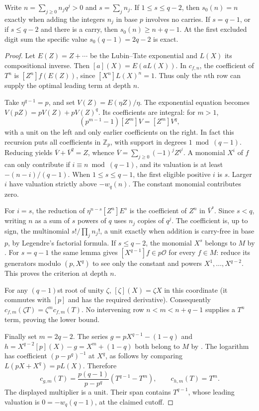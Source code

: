 \begin{theorem}\label{thm:first-depth}
Write $n=\sum_{j\ge0}n_jq^j>0$ and $s=\sum_j n_j$. If $1\le s\le q-2$, then $s_0(n)=n$ exactly when adding the integers $n_j$ in base $p$ involves no carries. If $s=q-1$, or if $s\le q-2$ and there is a carry, then $s_0(n)\ge n+q-1$. At the first excluded digit sum the specific value $s_0(q-1)=2q-2$ is exact.
\end{theorem}
\begin{proof}
Let $E(Z)=Z+\cdots$ be the Lubin--Tate exponential and $L(X)$ its compositional inverse. Then $[a](X)=E(aL(X))$. In $c_{f,n}$, the coefficient of $T^n$ is $[Z^n]f(E(Z))$, since $[X^n]L(X)^n=1$. Thus only the $n$th row can supply the optimal leading term at depth $n$.

Take $\eta^{q-1}=p$, and set $V(Z)=E(\eta Z)/\eta$. The exponential equation becomes $V(pZ)=pV(Z)+pV(Z)^q$. Its coefficients are integral: for $m>1$,
\[
 (p^{m-1}-1)[Z^m]V=[Z^m]V^q,
\]
with a unit on the left and only earlier coefficients on the right. In fact this recursion puts all coefficients in $\mathbb Z_p$, with support in degrees $1\bmod(q-1)$. Reducing yields $\overline V+\overline V^q=Z$, whence $\overline V=\sum_{j\ge0}(-1)^j Z^{q^j}$. A monomial $X^i$ of $f$ can only contribute if $i\equiv n\bmod(q-1)$, and its valuation is at least $-(n-i)/(q-1)$. When $1\le s\le q-1$, the first eligible positive $i$ is $s$. Larger $i$ have valuation strictly above $-w_q(n)$. The constant monomial contributes zero.

For $i=s$, the reduction of $\eta^{n-s}[Z^n]E^s$ is the coefficient of $Z^n$ in $\overline V^s$. Since $s<q$, writing $n$ as a sum of $s$ powers of $q$ uses $n_j$ copies of $q^j$. The coefficient is, up to sign, the multinomial $s!/\prod_j n_j!$, a unit exactly when addition is carry-free in base $p$, by Legendre's factorial formula. If $s\le q-2$, the monomial $X^s$ belongs to $M$ by \cite[Lemma 5.2]{BS}. For $s=q-1$ the same lemma gives $[X^{q-1}]f\in p\mathcal O$ for every $f\in M$: reduce its generators modulo $(p,X^q)$ to see only the constant and powers $X^1,\ldots,X^{q-2}$. This proves the criterion at depth $n$.

For any $(q-1)$st root of unity $\zeta$, $[\zeta](X)=\zeta X$ in this coordinate (it commutes with $[p]$ and has the required derivative). Consequently $c_{f,m}(\zeta T)=\zeta^m c_{f,m}(T)$. No intervening row $n<m<n+q-1$ supplies a $T^n$ term, proving the lower bound.

Finally set $m=2q-2$. The series $g=pX^{q-1}-(1-q)$ and $h=X^{q-2}[p](X)-g=X^m+(1-q)$ both belong to $M$ by \cite[Lemma 5.2]{BS}. The logarithm has coefficient $(p-p^q)^{-1}$ at $X^q$, as follows by comparing $L(pX+X^q)=pL(X)$. Therefore
\[
 c_{g,m}(T)=\frac{p(q-1)}{p-p^q}(T^{q-1}-T^m),\qquad c_{h,m}(T)=T^m.
\]
The displayed multiplier is a unit. Their span contains $T^{q-1}$, whose leading valuation is $0=-w_q(q-1)$, at the claimed cutoff.
\end{proof}
